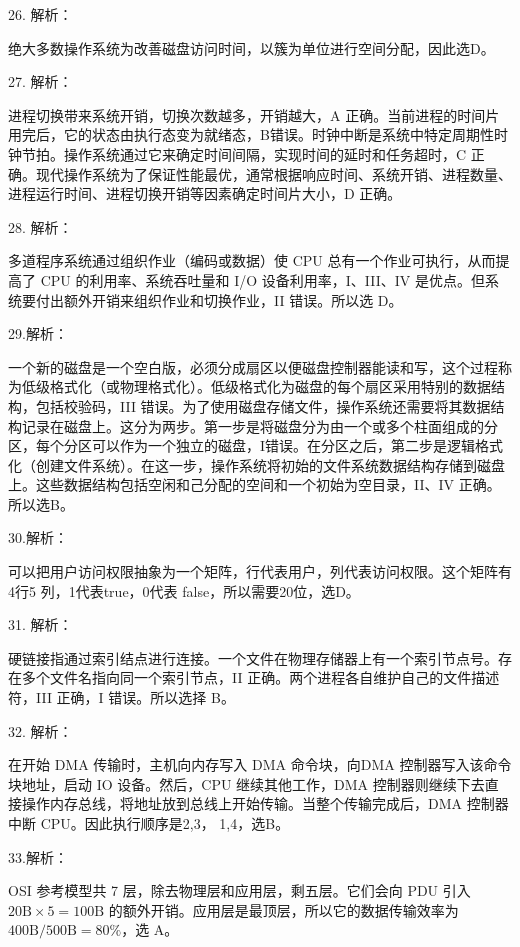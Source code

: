 \documentclass[UTF8,11pt]{ctexart}
\begin{document}
26. 解析：


绝大多数操作系统为改善磁盘访问时间，以簇为单位进行空间分配，因此选D。


27. 解析：


进程切换带来系统开销，切换次数越多，开销越大，A 正确。当前进程的时间片用完后，它的状态由执行态变为就绪态，B错误。时钟中断是系统中特定周期性时钟节拍。操作系统通过它来确定时间间隔，实现时间的延时和任务超时，C 正确。现代操作系统为了保证性能最优，通常根据响应时间、系统开销、进程数量、进程运行时间、进程切换开销等因素确定时间片大小，D 正确。


28. 解析：


多道程序系统通过组织作业（编码或数据）使 CPU 总有一个作业可执行，从而提高了 CPU 的利用率、系统吞吐量和 I/O 设备利用率，I、III、IV 是优点。但系统要付出额外开销来组织作业和切换作业，II 错误。所以选 D。


29.解析：


一个新的磁盘是一个空白版，必须分成扇区以便磁盘控制器能读和写，这个过程称为低级格式化（或物理格式化）。低级格式化为磁盘的每个扇区采用特别的数据结构，包括校验码，III 错误。为了使用磁盘存储文件，操作系统还需要将其数据结构记录在磁盘上。这分为两步。第一步是将磁盘分为由一个或多个柱面组成的分区，每个分区可以作为一个独立的磁盘，I错误。在分区之后，第二步是逻辑格式化（创建文件系统）。在这一步，操作系统将初始的文件系统数据结构存储到磁盘上。这些数据结构包括空闲和己分配的空间和一个初始为空目录，II、IV 正确。所以选B。


30.解析：


可以把用户访问权限抽象为一个矩阵，行代表用户，列代表访问权限。这个矩阵有4行5 列，1代表true，0代表 false，所以需要20位，选D。


31. 解析：


硬链接指通过索引结点进行连接。一个文件在物理存储器上有一个索引节点号。存在多个文件名指向同一个索引节点，II 正确。两个进程各自维护自己的文件描述符，III 正确，I 错误。所以选择 B。


32. 解析：


在开始 DMA 传输时，主机向内存写入 DMA 命令块，向DMA 控制器写入该命令块地址，启动 IO 设备。然后，CPU 继续其他工作，DMA 控制器则继续下去直接操作内存总线，将地址放到总线上开始传输。当整个传输完成后，DMA 控制器中断 CPU。因此执行顺序是2,3， 1,4，选B。


33.解析：


OSI 参考模型共 7 层，除去物理层和应用层，剩五层。它们会向 PDU 引入 \(\displaystyle 20\mathrm{B}\times5=100\mathrm{B}\) 的额外开销。应用层是最顶层，所以它的数据传输效率为 \(\displaystyle 400\mathrm{B}/500\mathrm{B}=80\%\)，选 A。
\end{document}
